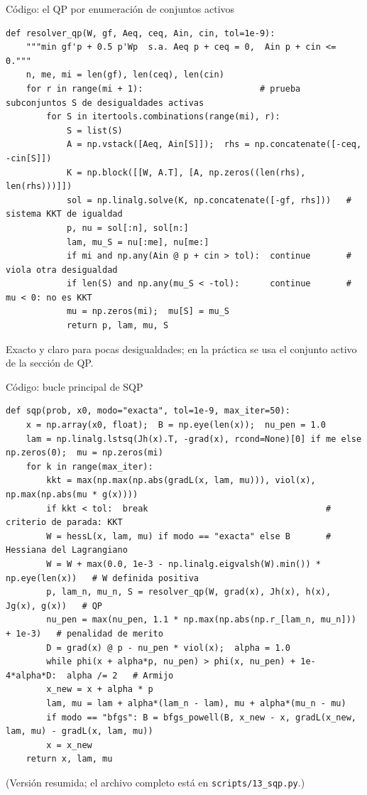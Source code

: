 \documentclass[aspectratio=169]{beamer}
\begin{document}
\begin{frame}[fragile]{Código: el QP por enumeración de conjuntos activos}
\begin{lstlisting}[basicstyle=\ttfamily\fontsize{7}{8.2}\selectfont,breaklines=false]
def resolver_qp(W, gf, Aeq, ceq, Ain, cin, tol=1e-9):
    """min gf'p + 0.5 p'Wp  s.a. Aeq p + ceq = 0,  Ain p + cin <= 0."""
    n, me, mi = len(gf), len(ceq), len(cin)
    for r in range(mi + 1):                       # prueba subconjuntos S de desigualdades activas
        for S in itertools.combinations(range(mi), r):
            S = list(S)
            A = np.vstack([Aeq, Ain[S]]);  rhs = np.concatenate([-ceq, -cin[S]])
            K = np.block([[W, A.T], [A, np.zeros((len(rhs), len(rhs)))]])
            sol = np.linalg.solve(K, np.concatenate([-gf, rhs]))   # sistema KKT de igualdad
            p, nu = sol[:n], sol[n:]
            lam, mu_S = nu[:me], nu[me:]
            if mi and np.any(Ain @ p + cin > tol):  continue       # viola otra desigualdad
            if len(S) and np.any(mu_S < -tol):      continue       # mu < 0: no es KKT
            mu = np.zeros(mi);  mu[S] = mu_S
            return p, lam, mu, S
\end{lstlisting}
  \small Exacto y claro para pocas desigualdades; en la práctica se usa el conjunto activo de la sección de QP.
\end{frame}

\begin{frame}[fragile]{Código: bucle principal de SQP}
\begin{lstlisting}[basicstyle=\ttfamily\fontsize{7}{8.2}\selectfont,breaklines=false]
def sqp(prob, x0, modo="exacta", tol=1e-9, max_iter=50):
    x = np.array(x0, float);  B = np.eye(len(x));  nu_pen = 1.0
    lam = np.linalg.lstsq(Jh(x).T, -grad(x), rcond=None)[0] if me else np.zeros(0);  mu = np.zeros(mi)
    for k in range(max_iter):
        kkt = max(np.max(np.abs(gradL(x, lam, mu))), viol(x), np.max(np.abs(mu * g(x))))
        if kkt < tol:  break                                   # criterio de parada: KKT
        W = hessL(x, lam, mu) if modo == "exacta" else B       # Hessiana del Lagrangiano
        W = W + max(0.0, 1e-3 - np.linalg.eigvalsh(W).min()) * np.eye(len(x))   # W definida positiva
        p, lam_n, mu_n, S = resolver_qp(W, grad(x), Jh(x), h(x), Jg(x), g(x))   # QP
        nu_pen = max(nu_pen, 1.1 * np.max(np.abs(np.r_[lam_n, mu_n])) + 1e-3)   # penalidad de merito
        D = grad(x) @ p - nu_pen * viol(x);  alpha = 1.0
        while phi(x + alpha*p, nu_pen) > phi(x, nu_pen) + 1e-4*alpha*D:  alpha /= 2   # Armijo
        x_new = x + alpha * p
        lam, mu = lam + alpha*(lam_n - lam), mu + alpha*(mu_n - mu)
        if modo == "bfgs": B = bfgs_powell(B, x_new - x, gradL(x_new, lam, mu) - gradL(x, lam, mu))
        x = x_new
    return x, lam, mu
\end{lstlisting}
  \small (Versión resumida; el archivo completo está en \texttt{scripts/13\_sqp.py}.)
\end{frame}
\end{document}
